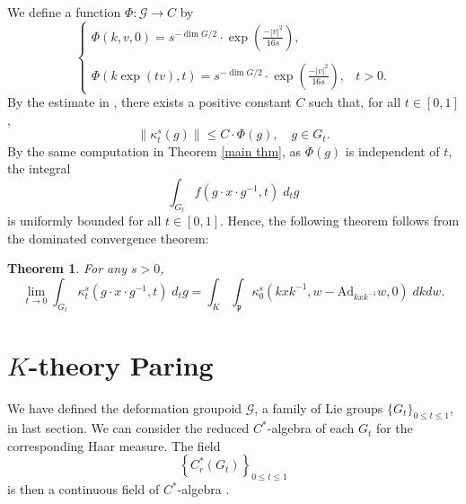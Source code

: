 \documentclass{amsproc}
\newtheorem{theorem}{Theorem}[section]
\theoremstyle{definition}
\theoremstyle{remark}
\numberwithin{equation}{section}
\newcommand{\kp}{\mathfrak{p}}
\begin{document}
 We define a function $\Phi\colon \mathcal{G} \to C$ by 
\[ 
\begin{cases}
\Phi(k, v, 0) = s^{-\dim G/2} \cdot \exp\left(\frac{-|v|^2}{16s}\right)
,\\
 &\\
\Phi(k\exp(tv), t) = s^{-\dim G/2} \cdot \exp\left(\frac{-|v|^2}{16s}\right)
, & t > 0. 
 \end{cases}
\]
By the estimate in \cite{Li-Yau}, there exists a positive constant $C$ such that, for all $t\in [0, 1]$, 
\begin{equation}
\|\kappa_t^s(g)\|\leq C \cdot \Phi(g), \quad g \in G_t. 
\end{equation}
By the same computation in Theorem \ref{main thm}, as $\Phi(g)$ is independent of $t$, the integral
\[
\int_{G_t} f(g \cdot x \cdot  g^{-1}, t) \; d_t g 
\]
is uniformly bounded for all $t \in [0, 1]$. Hence, the following theorem 
follows from the dominated convergence theorem:
\begin{theorem}
\label{contin thm}
For any $s > 0$, 
\[
\lim_{t \to 0} \int_{G_t} \kappa^s_t(g \cdot x \cdot  g^{-1}, t) \; d_t g = \int_K  \int_\kp \kappa^s_0\left(kx k^{-1}, w-\text{Ad}_{kx k^{-1}}   w , 0\right ) \; dk dw .
\]	
\end{theorem}



\section{$K$-theory Paring}\label{sec:pairing}
We have defined the deformation groupoid $\mathcal{G}$, a family of Lie groups $\{G_t\}_{0\leq t \leq 1}$, in last section. We can consider the reduced $C^*$-algebra of each $G_t$ for the corresponding Haar measure. The field
\[
\left\{ C^*_r(G_t) \right\}_{0 \leq t \leq 1}
\]
is then a continuous field of $C^*$-algebra \cite[Section 6.2]{higson-mackey}. 
\end{document}
